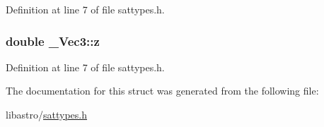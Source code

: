 Definition at line 7 of file sattypes.\-h.

\hypertarget{struct___vec3_a00c51a769832f289d58ad4ec07331ab8}{
\subsubsection[{z}]{\setlength{\rightskip}{0pt plus 5cm}double \-\_\-\-Vec3\-::z}}\label{struct___vec3_a00c51a769832f289d58ad4ec07331ab8}


Definition at line 7 of file sattypes.\-h.



The documentation for this struct was generated from the following file\-:\begin{DoxyCompactItemize}
\item 
libastro/\hyperlink{sattypes_8h}{sattypes.\-h}\end{DoxyCompactItemize}
